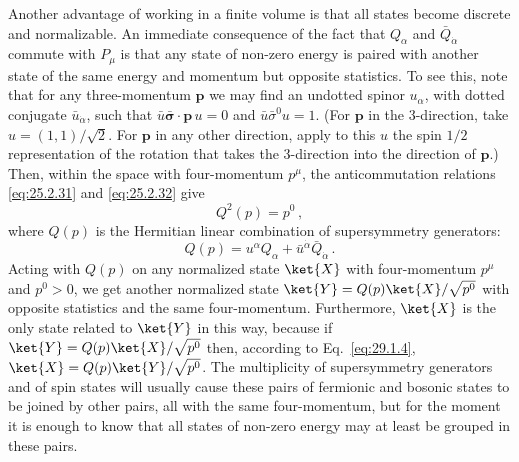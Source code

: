 Another advantage of working in a finite volume is that all states become
discrete and normalizable. An immediate consequence of the fact that
\(Q_\alpha\) and \(\bar Q_{\dot\alpha}\) commute with \(P_\mu\) is that
any state of non-zero energy is
paired with another state of the same energy and momentum but opposite
statistics. To see this, note that for any three-momentum \(\mathbf p\) we
may find an undotted spinor \(u_\alpha\), with dotted conjugate
\(\bar u_{\dot\alpha}\), such that
\(\bar u\bar{\boldsymbol{\sigma}}\mathbin{\cdot}\mathbf p\,u=0\)
and \(\bar u\bar\sigma^0u=1\). (For \(\mathbf p\) in the
3-direction, take \(u=(1,1)/\sqrt{2}\). For \(\mathbf p\) in any other
direction, apply to this \(u\) the spin \(1/2\) representation of the
rotation that takes the 3-direction into the direction of \(\mathbf p\).)
Then, within the space with four-momentum \(p^\mu\), the anticommutation
relations \eqref{eq:25.2.31} and \eqref{eq:25.2.32} give
\begin{equation}
  Q^2(p)=p^0\,,
  \tag{29.1.4}\label{eq:29.1.4}
\end{equation}
where \(Q(p)\) is the Hermitian linear combination of supersymmetry
generators:
\begin{equation}
  Q(p)=u^\alpha Q_\alpha
    +\bar u^{\dot\alpha}\bar Q_{\dot\alpha}\,.
  \tag{29.1.5}\label{eq:29.1.5}
\end{equation}
Acting with \(Q(p)\) on any normalized state \(\ket{X}\) with
four-momentum \(p^\mu\) and \(p^0>0\), we get another normalized state
\(\ket{Y}=Q(p)\ket{X}/\sqrt{p^0}\) with opposite statistics and the same
four-momentum. Furthermore, \(\ket{X}\) is the only state related to
\(\ket{Y}\) in this way, because if
\(\ket{Y}=Q(p)\ket{X}/\sqrt{p^0}\) then, according to
Eq.~\eqref{eq:29.1.4}, \(\ket{X}=Q(p)\ket{Y}/\sqrt{p^0}\). The
multiplicity of supersymmetry generators and of spin states will usually
cause these pairs of fermionic and bosonic states to be joined by other
pairs, all with the same four-momentum, but for the moment it is enough to
know that all states of non-zero energy may at least be grouped in these
pairs.

